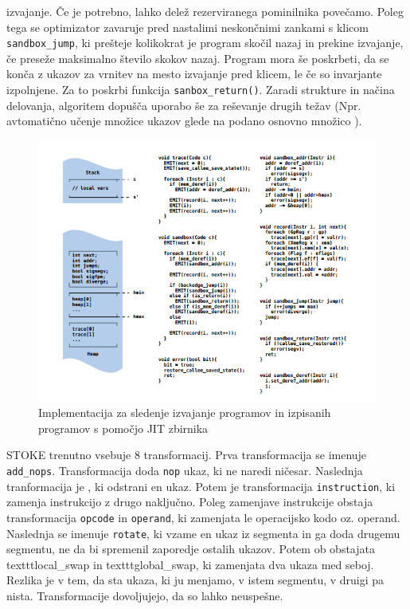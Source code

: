 \documentclass[a4paper, 12pt]{book}
\begin{document}
izvajanje. Če je potrebno, lahko delež rezerviranega pominilnika povečamo. Poleg tega se optimizator zavaruje pred nastalimi neskončnimi zankami s klicom \texttt{sandbox\_jump}, ki prešteje kolikokrat je program skočil nazaj in prekine izvajanje, če preseže maksimalno število skokov nazaj. Program mora še poskrbeti, da se konča z ukazov za vrnitev na mesto izvajanje pred klicem, le če so invarjante izpolnjene. Za to poskrbi funkcija \texttt{sanbox\_return()}. Zaradi strukture in načina delovanja, algoritem dopušča uporabo še za reševanje drugih težav (Npr. avtomatično učenje množice ukazov glede na podano osnovno množico \cite{article4}).%
		\begin{figure}[htb]
			\begin{center}
				\includegraphics[width=15cm]{graf3.jpg}
			\end{center}
			\caption{Implementacija za sledenje izvajanje programov in izpisanih programov s pomočjo JIT zbirnika}
			\label{pic3}
		\end{figure}
	STOKE trenutno vsebuje 8 transformacij. Prva transformacija se imenuje \texttt{add\_nops}. Transformacija doda \texttt{nop} ukaz, ki ne naredi ničesar. Naslednja tranformacija je , ki odstrani en ukaz. Potem je transformacija \texttt{instruction}, ki zamenja instrukcijo z drugo naključno. Poleg zamenjave instrukcije obstaja transformacija \texttt{opcode} in \texttt{operand}, ki zamenjata le operacijsko kodo oz. operand. Naslednja se imenuje \texttt{rotate}, ki vzame en ukaz iz segmenta in ga doda drugemu segmentu, ne da bi spremenil zaporedje ostalih ukazov. Potem ob obstajata texttt{local\_swap} in texttt{global\_swap}, ki zamenjata dva ukaza med seboj. Rezlika je v tem, da sta ukaza, ki ju menjamo, v istem segmentu, v druigi pa nista. Transformacije dovoljujejo, da so lahko neuspešne.%
\end{document}
